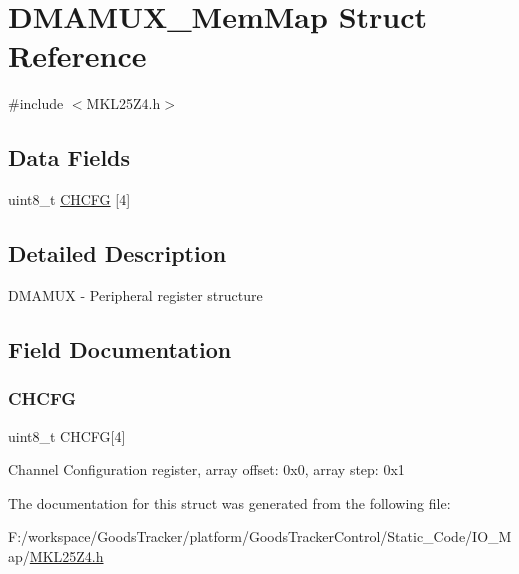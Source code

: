 \hypertarget{struct_d_m_a_m_u_x___mem_map}{}\section{D\+M\+A\+M\+U\+X\+\_\+\+Mem\+Map Struct Reference}
\label{struct_d_m_a_m_u_x___mem_map}


{\ttfamily \#include $<$M\+K\+L25\+Z4.\+h$>$}

\subsection*{Data Fields}
\begin{DoxyCompactItemize}
\item 
uint8\+\_\+t \hyperlink{struct_d_m_a_m_u_x___mem_map_a64e588f876a699e0490628f97bb17121}{C\+H\+C\+FG} \mbox{[}4\mbox{]}
\end{DoxyCompactItemize}


\subsection{Detailed Description}
D\+M\+A\+M\+UX -\/ Peripheral register structure 

\subsection{Field Documentation}
\mbox{\label{struct_d_m_a_m_u_x___mem_map_a64e588f876a699e0490628f97bb17121}} 
\subsubsection{\texorpdfstring{C\+H\+C\+FG}{CHCFG}}
{\footnotesize\ttfamily uint8\+\_\+t C\+H\+C\+FG\mbox{[}4\mbox{]}}

Channel Configuration register, array offset\+: 0x0, array step\+: 0x1 

The documentation for this struct was generated from the following file\+:\begin{DoxyCompactItemize}
\item 
F\+:/workspace/\+Goods\+Tracker/platform/\+Goods\+Tracker\+Control/\+Static\+\_\+\+Code/\+I\+O\+\_\+\+Map/\hyperlink{_m_k_l25_z4_8h}{M\+K\+L25\+Z4.\+h}\end{DoxyCompactItemize}
